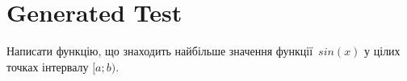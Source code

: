 \documentclass[12pt]{article}
\begin{document}
\section*{Generated Test}

Написати функцію, що знаходить найбільше значення функції~$sin(x)$ у цілих точках інтервалу $[a; b)$.


\end{document}
